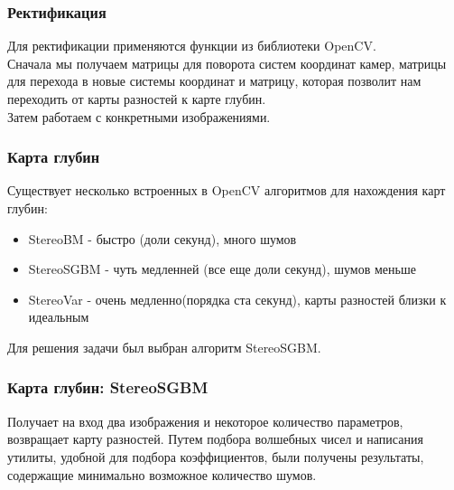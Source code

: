 \documentclass{beamer}
\begin{document}
		\begin{frame}
			\frametitle{Ректификация}
			
			Для ректификации применяются функции из библиотеки OpenCV.\\
			Сначала мы получаем матрицы для поворота систем координат камер, матрицы для
			перехода в новые системы координат и матрицу, которая позволит нам переходить
			от карты разностей к карте глубин.\\
			Затем работаем с конкретными изображениями.
		\end{frame}
		
		\begin{frame}
			\frametitle{Карта глубин}
			
			Существует несколько встроенных в OpenCV алгоритмов для нахождения карт               
			глубин:
			\begin{itemize}
				\item StereoBM - быстро (доли секунд), много шумов
				\item StereoSGBM - чуть медленней (все еще доли секунд), шумов меньше
				\item StereoVar - очень медленно(порядка ста секунд), карты разностей 	
					  близки к идеальным
			\end{itemize}	
			Для решения задачи был выбран алгоритм StereoSGBM.
		\end{frame}
		
		\begin{frame}
			\frametitle{Карта глубин: StereoSGBM}
			
			Получает на вход два изображения и некоторое количество параметров,
			возвращает карту разностей. Путем подбора волшебных чисел и написания
			утилиты, удобной для подбора коэффициентов, были получены результаты,
			содержащие минимально возможное количество шумов.
		\end{frame}
		
\end{document}
